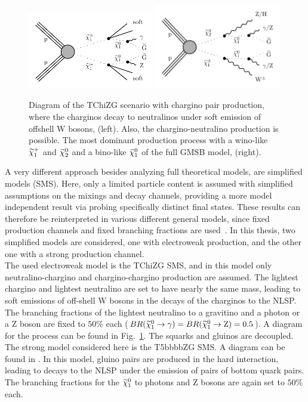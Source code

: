 \begin{figure}[hbtp]
 \centering
 \includegraphics[width=0.49\textwidth]{figures/signal/TChiNG}
 \includegraphics[width=0.49\textwidth]{figures/signal/gmsb}
 \caption{Diagram of the TChiZG scenario with chargino pair production, where the charginos decay to neutralinos under soft emission of offshell W bosons, (left). Also, the chargino-neutralino production is possible. The most dominant production process with a wino-like $\widetilde{\chi}^{+}_{1}$ and $\widetilde{\chi}^{0}_{2}$ and a bino-like $\widetilde{\chi}^{0}_{1}$ of the full GMSB model, (right).}
 \label{fig:ewkSMS}
\end{figure}



A very different approach besides analyzing full theoretical models, are simplified models (SMS)\cite{SMS}. Here, only a limited particle content is assumed with simplified assumptions on the mixings and decay channels, providing a more model independent result via probing specifically distinct final states. These results can therefore be reinterpreted in various different general models, since fixed production channels and fixed branching fractions are used~\cite{SMSReInt}. In this thesis, two simplified models are considered, one with electroweak production, and the other one with a strong production channel.\\
The used electroweak model is the TChiZG SMS, and in this model only neutralino-chargino and chargino-chargino production are assumed. The lightest chargino and lightest neutralino are set to have nearly the same mass, leading to soft emissions of off-shell W bosons in the decays of the charginos to the NLSP. The branching fractions of the lightest neutralino to a gravitino and a photon or a Z boson are fixed to $50\%$ each ($BR(\widetilde{\chi}^{0}_{1}\to\gamma)=BR(\widetilde{\chi}^{0}_{1}\to\mathrm{Z})=0.5$). A diagram for the process can be found in Fig.~\ref{fig:ewkSMS}. The squarks and gluinos are decoupled.\\
The strong model considered here is the T5bbbbZG SMS. A diagram can be found in . In this model, gluino pairs are produced in the hard interaction, leading to decays to the NLSP under the emission of pairs of bottom quark pairs. The branching fractions for the $\widetilde{\chi}^{0}_{1}$ to photons and Z bosons are again set to $50\%$ each.

